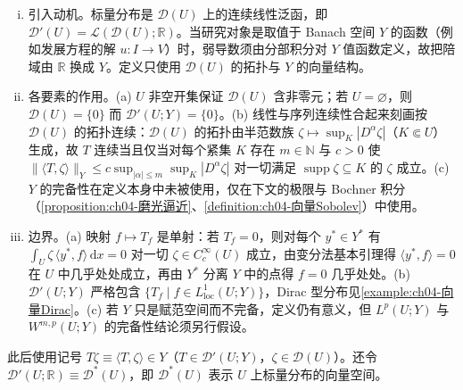 \documentclass[../../main.tex]{subfiles}%
\begin{document}
\begin{remark}\label{remark:ch04-向量分布动机}
\begin{enumerate}[(i)]
\item 引入动机。标量分布是 $\mathcal{D}(U)$ 上的连续线性泛函，即 $\mathcal{D}'(U)=\mathcal{L}(\mathcal{D}(U);\mathbb{R})$。当研究对象是取值于 Banach 空间 $Y$ 的函数（例如发展方程的解 $u:I\to V$）时，弱导数须由分部积分对 $Y$ 值函数定义，故把陪域由 $\mathbb{R}$ 换成 $Y$。定义只使用 $\mathcal{D}(U)$ 的拓扑与 $Y$ 的向量结构。

\item 各要素的作用。(a) $U$ 非空开集保证 $\mathcal{D}(U)$ 含非零元；若 $U=\varnothing$，则 $\mathcal{D}(U)=\{0\}$ 而 $\mathcal{D}'(U;Y)=\{0\}$。(b) 线性与序列连续性合起来刻画按 $\mathcal{D}(U)$ 的拓扑连续：$\mathcal{D}(U)$ 的拓扑由半范数族 $\zeta\mapsto\sup_{K}|D^\alpha\zeta|$（$K\Subset U$）生成，故 $T$ 连续当且仅当对每个紧集 $K$ 存在 $m\in\mathbb{N}$ 与 $c>0$ 使 $\|\langle T,\zeta\rangle\|_Y\leqslant c\sup_{|\alpha|\leqslant m}\sup_K|D^\alpha\zeta|$ 对一切满足 $\operatorname{supp}\zeta\subseteq K$ 的 $\zeta$ 成立。(c) $Y$ 的完备性在定义本身中未被使用，仅在下文的极限与 Bochner 积分（\cref{proposition:ch04-磨光逼近}、\cref{definition:ch04-向量Sobolev}）中使用。

\item 边界。(a) 映射 $f\mapsto T_f$ 是单射：若 $T_f=0$，则对每个 $y^*\in Y^*$ 有 $\int_U\zeta\,\langle y^*,f\rangle\,\mathrm{d}x=0$ 对一切 $\zeta\in C_c^\infty(U)$ 成立，由变分法基本引理得 $\langle y^*,f\rangle=0$ 在 $U$ 中几乎处处成立，再由 $Y^*$ 分离 $Y$ 中的点得 $f=0$ 几乎处处。(b) $\mathcal{D}'(U;Y)$ 严格包含 $\{T_f\mid f\in L^1_{\mathrm{loc}}(U;Y)\}$，Dirac 型分布见\cref{example:ch04-向量Dirac}。(c) 若 $Y$ 只是赋范空间而不完备，定义仍有意义，但 $L^p(U;Y)$ 与 $W^{m,p}(U;Y)$ 的完备性结论须另行假设。
\end{enumerate}
\end{remark}

此后使用记号 $T\zeta\equiv\langle T,\zeta\rangle\in Y$（$T\in\mathcal{D}'(U;Y)$，$\zeta\in\mathcal{D}(U)$）。还令 $\mathcal{D}'(U;\mathbb{R})\equiv\mathcal{D}^*(U)$，即 $\mathcal{D}^*(U)$ 表示 $U$ 上标量分布的向量空间。
\end{document}
